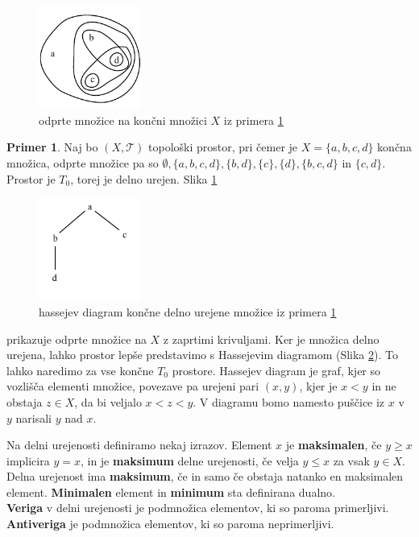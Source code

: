 \documentclass[a4paper, 12pt]{book}
\theoremstyle{definition}
\newtheorem{example}{Primer}[section]
\theoremstyle{remark}
\begin{document}
\begin{figure}[h]
  \label{pic1}
    \begin{center}
    \includegraphics[width=0.3\textwidth]{example-topology.pdf}
    \end{center}
    \caption{odprte množice na končni množici $X$ iz primera \ref{ex1}}
\end{figure}
\begin{example}\label{ex1}
  Naj bo $(X,\mathcal{T})$ topološki prostor, pri čemer je $X = \{a,b,c,d\}$ končna
  množica, odprte množice pa so $\emptyset, \{a,b,c,d\}, \{b,d\}, \{c\}, \{d\},
  \{b,c,d\}$ in $\{c,d\}$. Prostor je $T_0$, torej je delno urejen. Slika \ref{pic1}
  \begin{figure}[h]
      \begin{center}
      \includegraphics[width=0.3\textwidth]{hasse-example.pdf}
      \end{center}
      \caption{hassejev diagram končne delno urejene množice iz primera \ref{ex1}}
      \label{pic2}
  \end{figure}
    prikazuje odprte množice na $X$ z zaprtimi krivuljami.
    Ker je množica delno urejena, lahko prostor lepše predstavimo s Hassejevim diagramom (Slika \ref{pic2}).
    To lahko naredimo za vse končne $T_0$ prostore. Hassejev diagram je graf,
    kjer so vozlišča elementi množice, povezave pa urejeni pari $(x,y)$, kjer je $x < y$ in
    ne obstaja $z \in X$, da bi veljalo $x < z < y$. V diagramu
    bomo namesto puščice iz $x$ v $y$ narisali $y$ nad $x$.
\end{example}
\newpage
Na delni urejenosti definiramo nekaj izrazov.
Element $x$ je \textbf{maksimalen}, če $y \geq x$ implicira $y=x$, in je \textbf{maksimum} delne urejenosti, če velja
$y \leq x$ za vsak $y \in X$. Delna urejenost ima \textbf{maksimum}, če in samo če
obstaja natanko en maksimalen element. \textbf{Minimalen} element in \textbf{minimum} sta
definirana dualno.\\
\textbf{Veriga} v delni urejenosti je podmnožica elementov, ki so paroma primerljivi.
\textbf{Antiveriga} je podmnožica elementov, ki so paroma neprimerljivi.\\
\end{document}
